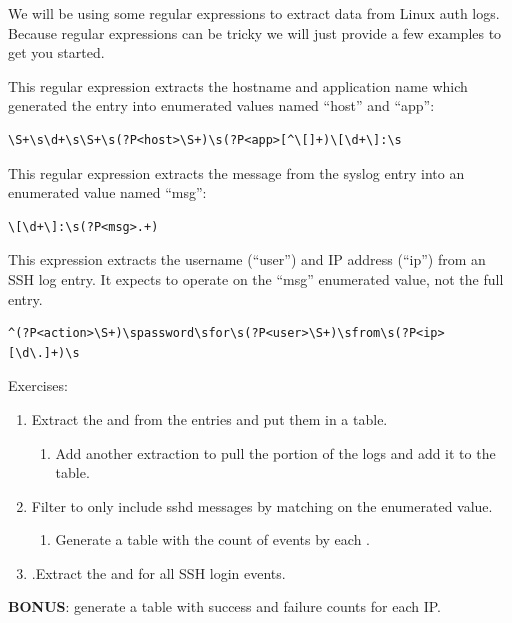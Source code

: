 We will be using some regular expressions to extract data from Linux
auth logs. Because regular expressions can be tricky we will just
provide a few examples to get you started.

This regular expression extracts the hostname and application name which generated the entry into enumerated values named ``host'' and ``app'':

\begin{Verbatim}[breaklines=true]
\S+\s\d+\s\S+\s(?P<host>\S+)\s(?P<app>[^\[]+)\[\d+\]:\s
\end{Verbatim}

This regular expression extracts the message from the syslog entry into an enumerated value named ``msg'':

\begin{Verbatim}[breaklines=true]
\[\d+\]:\s(?P<msg>.+)
\end{Verbatim}

This expression extracts the username (``user'') and IP address (``ip'') from an SSH log entry. It expects to operate on the ``msg'' enumerated value, not the full entry.

\begin{Verbatim}[breaklines=true]
^(?P<action>\S+)\spassword\sfor\s(?P<user>\S+)\sfrom\s(?P<ip>[\d\.]+)\s
\end{Verbatim}

Exercises:

\begin{enumerate}
\item
  Extract the  and  from the entries and put them in a
  table.
	\begin{enumerate}
	\item
	  Add another extraction to pull the  portion of the logs and
	  add it to the table.
	\end{enumerate}
\item
  Filter to only include sshd messages by matching on the  enumerated value.
	\begin{enumerate}
	\item
	  Generate a table with the count of  events by each .
	\end{enumerate}
\item
  .Extract the  and  for all SSH login events.
\end{enumerate}

\textbf{BONUS}: generate a table with success and failure counts for each IP.




